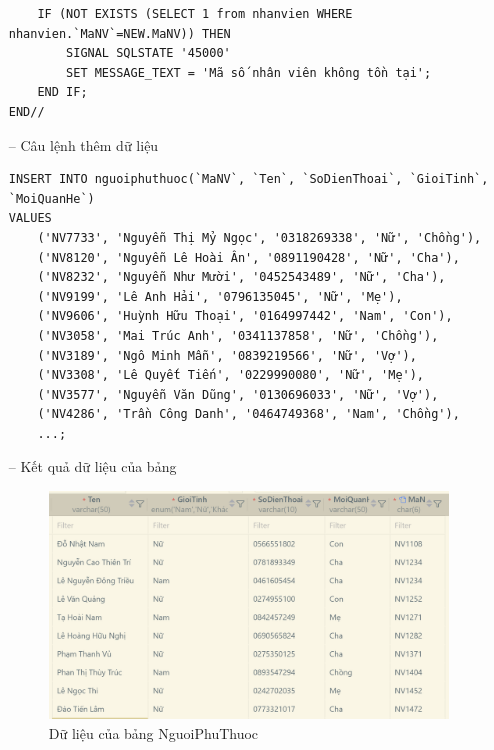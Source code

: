 \begin{itemize}
\begin{verbatim}
    IF (NOT EXISTS (SELECT 1 from nhanvien WHERE nhanvien.`MaNV`=NEW.MaNV)) THEN
        SIGNAL SQLSTATE '45000'
        SET MESSAGE_TEXT = 'Mã số nhân viên không tồn tại';
    END IF;
END//
    \end{verbatim}
    \newpage
    \item [--] Câu lệnh thêm dữ liệu
    \begin{verbatim}
INSERT INTO nguoiphuthuoc(`MaNV`, `Ten`, `SoDienThoai`, `GioiTinh`, `MoiQuanHe`)
VALUES
    ('NV7733', 'Nguyễn Thị Mỷ Ngọc', '0318269338', 'Nữ', 'Chồng'),
    ('NV8120', 'Nguyễn Lê Hoài Ân', '0891190428', 'Nữ', 'Cha'),
    ('NV8232', 'Nguyễn Như Mười', '0452543489', 'Nữ', 'Cha'),
    ('NV9199', 'Lê Anh Hải', '0796135045', 'Nữ', 'Mẹ'),
    ('NV9606', 'Huỳnh Hữu Thoại', '0164997442', 'Nam', 'Con'),
    ('NV3058', 'Mai Trúc Anh', '0341137858', 'Nữ', 'Chồng'),
    ('NV3189', 'Ngô Minh Mẫn', '0839219566', 'Nữ', 'Vợ'),
    ('NV3308', 'Lê Quyết Tiến', '0229990080', 'Nữ', 'Mẹ'),
    ('NV3577', 'Nguyễn Văn Dũng', '0130696033', 'Nữ', 'Vợ'),
    ('NV4286', 'Trần Công Danh', '0464749368', 'Nam', 'Chồng'),
    ...;
    \end{verbatim}
    \item [--] Kết quả dữ liệu của bảng
    \begin{figure}[H]
        \centering
        \includegraphics[width=1\linewidth]{content/images/data_nguoiphuthuoc.png}
        \caption{Dữ liệu của bảng NguoiPhuThuoc}
        \label{fig:data_nguoiphuthuoc}
    \end{figure}
\end{itemize}
\newpage
